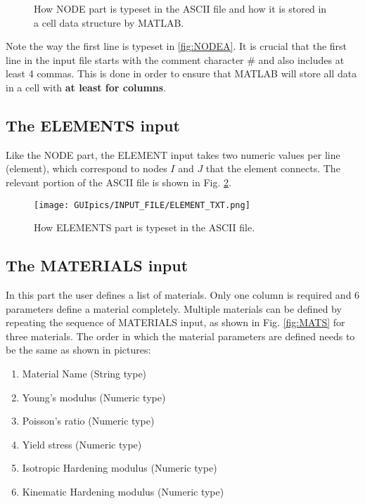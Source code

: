 \begin{appendices}
\begin{figure}
	\centering
	
	
	\caption{How NODE part is typeset in the ASCII file and how it is stored in 
		a cell data structure by MATLAB.}
	\label{fig:NODE}
\end{figure}

Note the way the first line is typeset in \ref{fig:NODEA}. It is crucial  that 
the first line in the input file starts with the comment character $\#$ and 
also includes at least 4 commas. This is done in order to ensure that MATLAB 
will store all data in a cell with \textbf{at least for columns}.

\subsection*{The ELEMENTS input}
Like the NODE part, the ELEMENT input takes two numeric values per line 
(element), which correspond to nodes $I$ and $J$ that the element connects. The 
relevant portion of the ASCII file is shown in Fig. \ref{fig:ELEMENTS}.

\begin{figure}
	\centering
	\texttt{[image: GUIpics/INPUT\_FILE/ELEMENT\_TXT.png]}
	\caption{How ELEMENTS part is typeset in the ASCII file.}
	\label{fig:ELEMENTS}
\end{figure}

\subsection*{The MATERIALS input}
In this part the user defines a list of materials. Only one column is required 
and 6 parameters define a material completely. Multiple materials can be 
defined by repeating the sequence of MATERIALS input, as shown in Fig. 
\ref{fig:MATS} for three materials. The order in which the material parameters 
are defined needs to be the same as shown in pictures: 
\begin{enumerate}
	\item Material Name (String type)
	\item Young's modulus (Numeric type)
	\item Poisson's ratio (Numeric type)
	\item Yield stress (Numeric type)
	\item Isotropic Hardening modulus (Numeric type)
	\item Kinematic Hardening modulus (Numeric type)
\end{enumerate}


\end{appendices}
